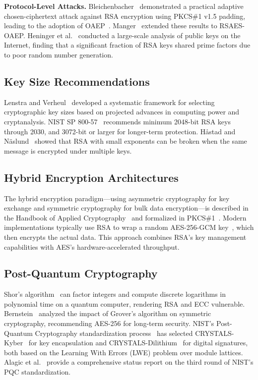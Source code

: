 \documentclass[journal]{IEEEtran}
\begin{document}
\textbf{Protocol-Level Attacks.}
Bleichenbacher~\cite{bleichenbacher1998} demonstrated a practical adaptive chosen-ciphertext attack against RSA encryption using PKCS\#1 v1.5 padding, leading to the adoption of OAEP~\cite{bellare1995}. Manger~\cite{manger2001} extended these results to RSAES-OAEP. Heninger et al.~\cite{heninger2012} conducted a large-scale analysis of public keys on the Internet, finding that a significant fraction of RSA keys shared prime factors due to poor random number generation.

\subsection{Key Size Recommendations}

Lenstra and Verheul~\cite{lenstra2001} developed a systematic framework for selecting cryptographic key sizes based on projected advances in computing power and cryptanalysis. NIST SP 800-57~\cite{nist_sp80057} recommends minimum 2048-bit RSA keys through 2030, and 3072-bit or larger for longer-term protection. Håstad and N\"aslund~\cite{hastad1989} showed that RSA with small exponents can be broken when the same message is encrypted under multiple keys.

\subsection{Hybrid Encryption Architectures}

The hybrid encryption paradigm---using asymmetric cryptography for key exchange and symmetric cryptography for bulk data encryption---is described in the Handbook of Applied Cryptography~\cite{menezes2001} and formalized in PKCS\#1~\cite{pkcs1_2016}. Modern implementations typically use RSA to wrap a random AES-256-GCM key~\cite{nist_fips197}, which then encrypts the actual data. This approach combines RSA's key management capabilities with AES's hardware-accelerated throughput.

\subsection{Post-Quantum Cryptography}

Shor's algorithm~\cite{shor1997} can factor integers and compute discrete logarithms in polynomial time on a quantum computer, rendering RSA and ECC vulnerable. Bernstein~\cite{bernstein2010} analyzed the impact of Grover's algorithm on symmetric cryptography, recommending AES-256 for long-term security. NIST's Post-Quantum Cryptography standardization process~\cite{nist_pqc} has selected CRYSTALS-Kyber~\cite{kyber2023} for key encapsulation and CRYSTALS-Dilithium~\cite{dilithium2022} for digital signatures, both based on the Learning With Errors (LWE) problem over module lattices. Alagic et al.~\cite{alagic2022} provide a comprehensive status report on the third round of NIST's PQC standardization.
\end{document}
